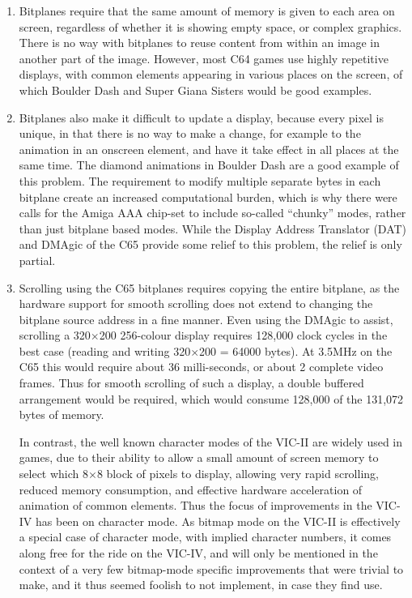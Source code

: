 \begin{enumerate}
\item Bitplanes require that the same amount of memory is given to each area on screen, regardless of whether it
is showing empty space, or complex graphics. There is no way with bitplanes to reuse content from within an image in
another part of the image.  However, most C64 games use highly repetitive displays, with common elements appearing in various
places on the screen, of which Boulder Dash and Super Giana Sisters would be good examples.

\item Bitplanes also make it difficult to update a display, because every pixel is unique, in that there is no way to make a change,
for example to the animation in an onscreen element, and have it take effect in all places at the same time. The diamond
animations in Boulder Dash are a good example of this problem.  The requirement to modify multiple separate bytes in each
bitplane create an increased computational burden, which is why there were calls for the Amiga AAA chip-set to include so-called
``chunky'' modes, rather than just bitplane based modes.  While the Display Address Translator (DAT) and DMAgic of the C65 provide some
relief to this problem, the relief is only partial.

\item Scrolling using the C65 bitplanes requires copying the entire bitplane, as the hardware support for smooth scrolling does not
extend to changing the bitplane source address in a fine manner.  Even using the DMAgic to assist, scrolling a 320$\times$200 256-colour
display requires 128,000 clock cycles in the best case (reading and writing 320$\times$200 = 64000 bytes). At 3.5MHz on the C65 this
would require about 36 milli-seconds, or about 2 complete video frames.  Thus for smooth scrolling of such a display, a double
buffered arrangement would be required, which would consume 128,000 of the 131,072 bytes of memory.

In contrast, the well known character modes of the VIC-II are widely used in games, due to their ability to allow a small amount
of screen memory to select which 8$\times$8 block of pixels to display, allowing very rapid scrolling, reduced memory consumption, and
effective hardware acceleration of animation of common elements.  Thus the focus of improvements in the VIC-IV has been on
character mode.  As bitmap mode on the VIC-II is effectively a special case of character mode, with implied character numbers, it
comes along free for the ride on the VIC-IV, and will only be mentioned in the context of a very few bitmap-mode specific
improvements that were trivial to make, and it thus seemed foolish to not implement, in case they find use.

\end{enumerate}

